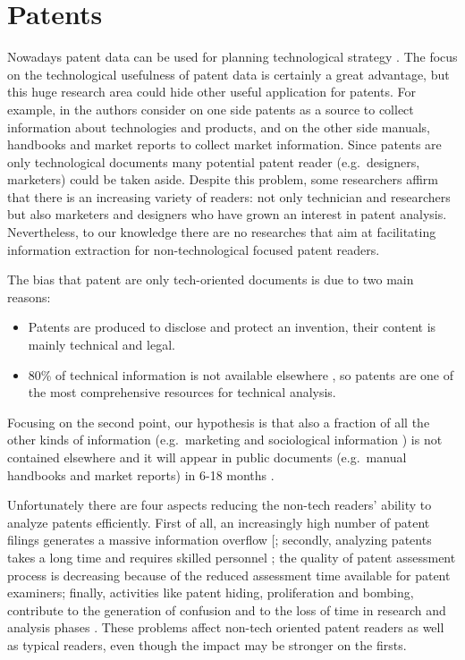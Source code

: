 \documentclass[]{book}
\providecommand{\tightlist}{%
  \setlength{\itemsep}{0pt}\setlength{\parskip}{0pt}}
\begin{document}
\section{Patents}\label{sotadocumentspatents}

Nowadays patent data can be used for planning technological strategy
\citep{ernst2003patent}. The focus on the technological usefulness of
patent data is certainly a great advantage, but this huge research area
could hide other useful application for patents. For example, in
\citep{jin2015technology} the authors consider on one side patents as a
source to collect information about technologies and products, and on
the other side manuals, handbooks and market reports to collect market
information. Since patents are only technological documents many
potential patent reader (e.g.~designers, marketers) could be taken
aside. Despite this problem, some researchers \citep{bonino2010review}
affirm that there is an increasing variety of readers: not only
technician and researchers but also marketers and designers who have
grown an interest in patent analysis. Nevertheless, to our knowledge
there are no researches that aim at facilitating information extraction
for non-technological focused patent readers.

The bias that patent are only tech-oriented documents is due to two main
reasons:

\begin{itemize}
\tightlist
\item
  Patents are produced to disclose and protect an invention, their
  content is mainly technical and legal.
\item
  80\% of technical information is not available elsewhere
  \citep{terragno1979}, so patents are one of the most comprehensive
  resources for technical analysis.
\end{itemize}

Focusing on the second point, our hypothesis is that also a fraction of
all the other kinds of information (e.g.~marketing and sociological
information ) is not contained elsewhere and it will appear in public
documents (e.g.~manual handbooks and market reports) in 6-18 months
\citep{golzio2012}.

Unfortunately there are four aspects reducing the non-tech readers'
ability to analyze patents efficiently. First of all, an increasingly
high number of patent filings generates a massive information overflow
{[}\citet{bergmann2008evaluating}; secondly, analyzing patents takes a
long time and requires skilled personnel \citep{liang2007text}; the
quality of patent assessment process is decreasing
\citep{burke2007, philipp2006} because of the reduced assessment time
available for patent examiners; finally, activities like patent hiding,
proliferation and bombing, contribute to the generation of confusion and
to the loss of time in research and analysis phases
\citep{fantoni2013automatic}. These problems affect non-tech oriented
patent readers as well as typical readers, even though the impact may be
stronger on the firsts.
\end{document}
